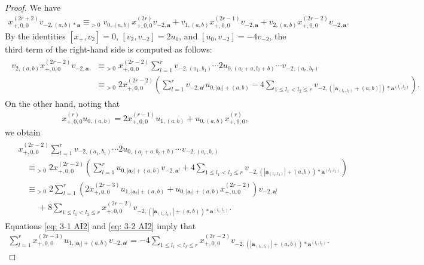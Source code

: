 \documentclass[12pt,a4paper]{amsart}
\theoremstyle{definition}
\numberwithin{equation}{subsection}
\begin{document}
\begin{proof}
  We have
  \begin{align}\label{eq: x2r v-2b der}
    x_{+,0,0}^{(2r+2)} v_{-2,(a,b)*\mathbf{a}} \equiv_{>0} v_{0,(a,b)} x_{+,0,0}^{(2r)} v_{-2,\mathbf{a}} + v_{1,(a,b)} x_{+,0,0}^{(2r-1)} v_{-2,\mathbf{a}} + v_{2,(a,b)} x_{+,0,0}^{(2r-2)} v_{-2,\mathbf{a}}.
  \end{align}
  By the identities $[x_+,v_2] = 0$, $[v_2,v_{-2}] = 2u_0$, and $[u_0,v_{-2}]=-4v_{-2}$, the third term of the right-hand side is computed as follows:
  \begin{align}\label{eq: 3-1 AI2}
    \begin{split}
      v_{2,(a,b)} x_{+,0,0}^{(2r-2)} v_{-2,\mathbf{a}}
      &\equiv_{>0} x_{+,0,0}^{(2r-2)} \sum_{l=1}^r v_{-2,(a_1,b_1)} \cdots 2u_{0,(a_l+a,b_l+b)} \cdots v_{-2,(a_r,b_r)}\\
      &\equiv_{>0} 2 x_{+,0,0}^{(2r-2)}(\sum_{l=1}^r v_{-2,\mathbf{a}^l} u_{0,|\mathbf{a}_l|+(a,b)} - 4\sum_{1 \leq l_1 < l_2 \leq r} v_{-2,(|\mathbf{a}_{(l_1,l_2)}+(a,b)|)*\mathbf{a}^{(l_1,l_2)}}).
    \end{split}
  \end{align}
  On the other hand, noting that
  \begin{align*}
    x_{+,0,0}^{(r)} u_{0,(a,b)} = 2 x_{+,0,0}^{(r-1)}u_{1,(a,b)} + u_{0,(a,b)}x_{+,0,0}^{(r)},
  \end{align*}
  we obtain
  \begin{align}\label{eq: 3-2 AI2}
    \begin{split}
      &x_{+,0,0}^{(2r-2)} \sum_{l=1}^r v_{-2,(a_1,b_1)} \cdots 2u_{0,(a_l+a,b_l+b)} \cdots v_{-2,(a_r,b_r)}\\
      &\quad\equiv_{>0} 2 x_{+,0,0}^{(2r-2)}(\sum_{l=1}^r u_{0,|\mathbf{a}_l|+(a,b)} v_{-2,\mathbf{a}^l} + 4\sum_{1 \leq l_1 < l_2 \leq r} v_{-2,(|\mathbf{a}_{(l_1,l_2)}|+(a,b))*\mathbf{a}^{(l_1,l_2)}})\\
      &\quad\equiv_{>0} 2\sum_{l=1}^r(2 x_{+,0,0}^{(2r-3)} u_{1,|\mathbf{a}_l|+(a,b)} + u_{0,|\mathbf{a}_l|+(a,b)} x_{+,0,0}^{(2r-2)}) v_{-2,\mathbf{a}^l}\\
      &\quad\phantom{\equiv} + 8\sum_{1 \leq l_1 < l_2 \leq r} x_{+,0,0}^{(2r-2)} v_{-2,(|\mathbf{a}_{(l_1,l_2)}|+(a,b))*\mathbf{a}^{(l_1,l_2)}}.
    \end{split}
  \end{align}
  Equations \eqref{eq: 3-1 AI2} and \eqref{eq: 3-2 AI2} imply that
  \begin{align}\label{eq: 3-3 AI2}
    \sum_{l=1}^r x_{+,0,0}^{(2r-3)} u_{1,|\mathbf{a}_l|+(a,b)} v_{-2,\mathbf{a}^l} = -4 \sum_{1 \leq l_1 < l_2 \leq r} x_{+,0,0}^{(2r-2)} v_{-2,(|\mathbf{a}_{(l_1,l_2)}|+(a,b))*\mathbf{a}^{(l_1,l_2)}}.
  \end{align}


\end{proof}
\end{document}
